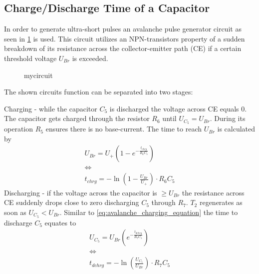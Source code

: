     \subsection{Charge/Discharge Time of a Capacitor}\label{sec:charge-discharge-time}
        In order to generate ultra-short pulses an avalanche pulse generator circuit as seen in \cref{fig:avalanche_pulse_generator_circuit}
        is used. This circuit utilizes an NPN-transistors property of a sudden breakdown of its resistance across the collector-emitter path (CE)
        if a certain threshold voltage \( U_{Br} \) is exceeded.\par
        \begin{figure}[h]
            \centering
            
            \caption{mycircuit}
            \label{fig:avalanche_pulse_generator_circuit}
        \end{figure}
        The shown circuits function can be separated into two stages:\par
        Charging - while the capacitor \( C_5 \) is discharged the voltage across CE equals 0. The capacitor gets charged
        through the resistor \( R_6 \) until \( U_{C_5} = U_{Br}\). During its operation \( R_5 \) ensures there is no
        base-current. The time to reach \( U_{Br} \) is calculated by
        \begin{gather}
            U_{Br} = U_+ \left( 1 - e^{-\frac{t_{chrg}}{R_6C_5}}\right) \nonumber \\
            \Leftrightarrow \nonumber \\
            t_{chrg} = - \ln\left(1 - \frac{U_{Br}}{U_+}\right) \cdot R_6 C_5
            \label{eq:avalanche_charging_equation}
        \end{gather}
        Discharging - if the voltage across the capacitor is \( \geq U_{Br} \) the resistance across CE suddenly drops close
        to zero discharging \( C_5 \) through \( R_7 \). \( T_2 \) regenerates as soon as \( U_{C_5} < U_{Br} \). Similar to \cref{eq:avalanche_charging_equation}
        the time to discharge \( C_5 \) equates to
        \begin{gather}
            U_{C_5} = U_{Br} \left(e^{-\frac{t_{dchrg}}{R_7C_5}}\right) \nonumber \\
            \Leftrightarrow \nonumber \\
            t_{dchrg} = -\ln\left( \frac{U_{C_5}}{U_{Br}} \right) \cdot R_7 C_5
            \label{eq:avalanche_discharging_equation}
        \end{gather}
